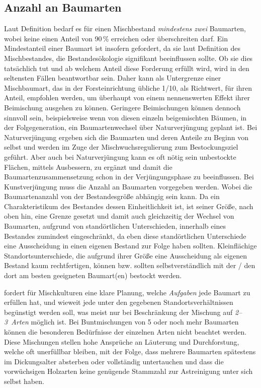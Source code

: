 \documentclass[twocolumn]{scrartcl}
\begin{document}
\subsection{Anzahl an Baumarten}
\label{ssec:anzahlBaumarten}

Laut Definition bedarf es für einen Mischbestand \emph{mindestens zwei}
Baumarten, wobei keine einen Anteil von 90\,\% erreichen oder überschreiten
darf. Ein Mindestanteil einer Baumart ist insofern gefordert, da sie laut
Definition des Mischbestandes, die Bestandesökologie signifikant beeinflussen
sollte. Ob sie dies tatsächlich tut und ab welchem Anteil diese Forderung
erfüllt wird, wird in den seltensten Fällen beantwortbar sein. Daher kann als
Untergrenze einer Mischbaumart, das in der Forsteinrichtung übliche 1/10, als
Richtwert, für ihren Anteil, empfohlen werden, um überhaupt von einem
nennenswerten Effekt ihrer Beimischung ausgehen zu können. Geringere
Beimischungen können dennoch sinnvoll sein, beispielsweise wenn von diesen
einzeln beigemischten Bäumen, in der Folgegeneration, ein Baumartenwechsel über
Naturverjüngung geplant ist. Bei Naturverjüngung ergeben sich die Baumarten und
deren Anteile zu Beginn von selbst und werden im Zuge der Mischwuchsregulierung
zum Bestockungsziel geführt. Aber auch bei Naturverjüngung kann es oft nötig
sein unbestockte Flächen, mittels Ausbessern, zu ergänzt und damit die
Baumartenzusammensetzung schon in der Verjüngungsphase zu beeinflussen. Bei
Kunstverjüngung muss die Anzahl an Baumarten vorgegeben werden. Wobei die
Baumartenanzahl von der Bestandesgröße abhängig sein kann. Da ein
Charakteristikum des Bestandes dessen Einheitlichkeit ist, ist seiner Größe,
nach oben hin, eine Grenze gesetzt und damit auch gleichzeitig der Wechsel von
Baumarten, aufgrund von standörtlichen Unterschieden, innerhalb eines Bestandes
zumindest eingeschränkt, da eben diese standörtlichen Unterschiede eine
Ausscheidung in einen eigenen Bestand zur Folge haben sollten. Kleinflächige
Standortsunterschiede, die aufgrund ihrer Größe eine Ausscheidung als eigenen
Bestand kaum rechtfertigen, können bzw. sollten selbstverständlich mit der / den
dort am besten geeigneten Baumart(en) bestockt werden.

\citet[S.~218\,f.]{wiedemann1951Ertragskunde} fordert für Mischkulturen \frqq
eine klare Planung, welche \emph{Aufgaben} jede Baumart zu erfüllen hat, und
wieweit jede unter den gegebenen Standortsverhältnissen begünstigt werden soll,
was meist nur bei Beschränkung der Mischung auf \emph{2--3~Arten} möglich ist.
Bei Buntmischungen von 5 oder noch mehr Baumarten können die besonderen
Bedürfnisse der einzelnen Arten nicht beachtet werden. Diese Mischungen stellen
hohe Ansprüche an Läuterung und Durchforstung, welche oft unerfüllbar bleiben,
mit der Folge, dass mehrere Baumarten spätestens im Dickungsalter absterben oder
vollständig untertauchen und dass die vorwüchsigen Holzarten keine genügende
Stammzahl zur Astreinigung unter sich selbst haben.\flqq{}
\end{document}
